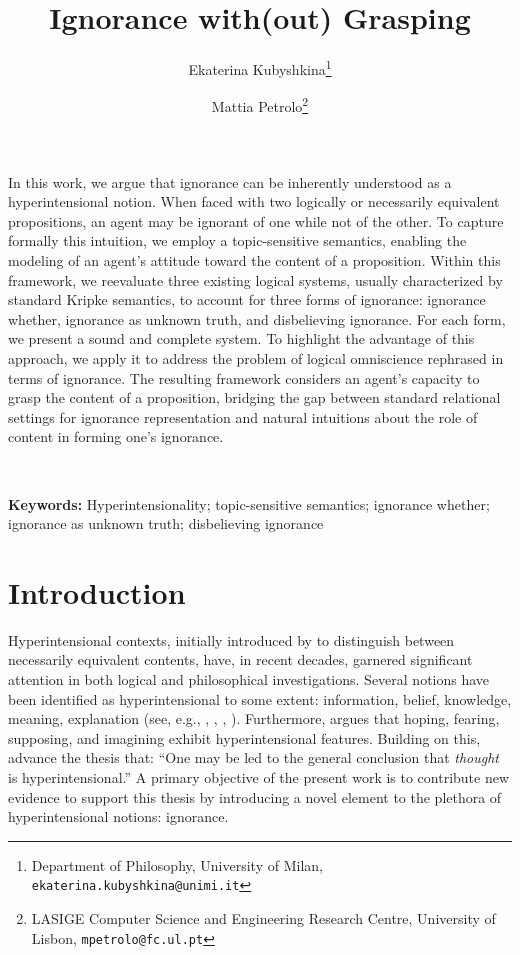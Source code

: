 \documentclass{article}
\date{}
\author{
  Ekaterina Kubyshkina\footnote{Department of Philosophy, University of Milan, \texttt{ekaterina.kubyshkina@unimi.it}}

  \and
  Mattia Petrolo\footnote{LASIGE Computer Science and Engineering Research Centre, University of Lisbon, \texttt{mpetrolo@fc.ul.pt}}

}
\title{Ignorance with(out) Grasping}
\providecommand{\keywords}[1]{\textbf{Keywords:} #1}
\begin{document}
\maketitle

\abstract


In this work, we argue that ignorance can be inherently understood as a hyperintensional notion. When faced with two logically or necessarily equivalent propositions, an agent may be ignorant of one while not of the other. To capture formally this intuition, we employ a topic-sensitive semantics, enabling the modeling of an agent's attitude toward the content of a proposition. Within this framework, we reevaluate three existing logical systems, usually characterized by standard Kripke semantics, to account for three forms of ignorance: ignorance whether, ignorance as unknown truth, and disbelieving ignorance. For each form, we present a sound and complete system. To highlight the advantage of this approach, we apply it to address the problem of logical omniscience rephrased in terms of ignorance. The resulting framework considers an agent's capacity to grasp the content of a proposition, bridging the gap between standard relational settings for ignorance representation and natural intuitions about the role of content in forming one's ignorance.


\


\keywords{Hyperintensionality; topic-sensitive semantics; ignorance whether; ignorance as unknown truth; disbelieving ignorance}
\section{Introduction}
\label{Intro}

Hyperintensional contexts, initially introduced by \citet{Cresswell1975} to distinguish between necessarily equivalent contents, have, in recent decades, garnered significant attention in both logical and philosophical investigations. Several notions have been identified as hyperintensional to some extent: information, belief, knowledge, meaning, explanation (see, e.g., \citet{Fine2017}, \citet{Leitgem2019}, \citet{Berto2019}, \citet{BertoH2021}). Furthermore, \citet{Wansing2017} argues that hoping, fearing, supposing, and imagining exhibit hyperintensional features. Building on this, \citet{BertoSEP} advance the thesis that: ``One may be led to the general conclusion that \textit{thought} is hyperintensional.'' A primary objective of the present work is to contribute new evidence to support this thesis by introducing a novel element to the plethora of hyperintensional notions: ignorance.
\end{document}
